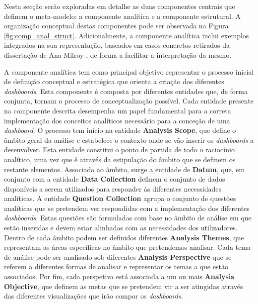 Nesta secção serão exploradas em detalhe as duas componentes centrais que definem o meta-modelo: a componente analítica e a componente estrutural. A organização conceptual destas componentes pode ser observada na Figura \ref{fig:comp_anal_struct}. Adicionalmente, a componente analítica inclui exemplos integrados na sua representação, baseados em casos concretos retirados da dissertação de Ana Milroy \cite{milroy2025}, de forma a facilitar a interpretação da mesmo.

A componente analítica tem como principal objetivo representar o processo inicial de definição conceptual e estratégica que orienta a criação dos diferentes \textit{dashboards}. Esta componente é composta por diferentes entidades que, de forma conjunta, tornam o processo de conceptualização possível. Cada entidade presente na componente descrita desempenha um papel fundamental para a correta implementação dos conceitos analíticos necessário para a conceção de uma \textit{dashboard}. O processo tem início na entidade \textbf{Analysis Scope}, que define o âmbito geral da análise e estabelece o contexto onde se vão inserir os \textit{dashboards} a desenvolver. Esta entidade constitui o ponto de partida de todo o raciocínio analítico, uma vez que é através da estipulação do âmbito que se definem os restante elementos. Associada ao âmbito, surge a entidade de \textbf{Datum}, que, em conjunto com a entidade \textbf{Data Collection} definem o conjunto de dados disponíveis a serem utilizados para responder às diferentes necessidades analíticas. A entidade \textbf{Question Collection} agrupa o conjunto de questões analíticas que se pretendem ver respondidas com a implementação dos diferentes \textit{dashboards}. Estas questões são formuladas com base no âmbito de análise em que estão inseridas e devem estar alinhadas com as necessidades dos utilizadores. Dentro de cada âmbito podem ser definidos diferentes \textbf{Analysis Themes}, que representam as áreas específicas no âmbito que pretendemos analisar. Cada tema de análise pode ser analisado sob diferentes \textbf{Analysis Perspective} que se referem a diferentes formas de analisar e representar os temas a que estão associados. Por fim, cada perspetiva está associada a um ou mais \textbf{Analysis Objective}, que definem as metas que se pretendem vir a ser atingidas através das diferentes visualizações que irão compor os \textit{dashboards}.

